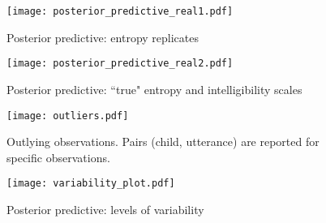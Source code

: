 %
\begin{figure}
	\centering
	\texttt{[image: posterior\_predictive\_real1.pdf]}
	\caption[Posterior predictive: entropy replicates]{Posterior predictive: entropy replicates}
	\label{fig:predictive1}
\end{figure}
%
\begin{figure}
	\centering
	\texttt{[image: posterior\_predictive\_real2.pdf]}
	\caption[Posterior predictive: ``true'' entropy and intelligibility scales]{Posterior predictive: ``true" entropy and intelligibility scales}
	\label{fig:predictive2}
\end{figure}
%
\begin{figure}
	\centering
	\texttt{[image: outliers.pdf]}
	\caption[Outlying observations]{Outlying observations. Pairs (child, utterance) are reported for specific observations.}
	\label{fig:outliers}
\end{figure}
%
\begin{figure}
	\centering
	\texttt{[image: variability\_plot.pdf]}
	\caption[Posterior predictive: levels of variability]{Posterior predictive: levels of variability}
	\label{fig:variability}
\end{figure}